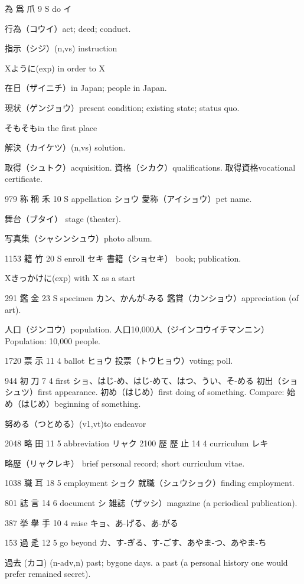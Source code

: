 為 爲 爪 9 S  do イ

行為（コウイ）act; deed; conduct.

指示（シジ）(n,vs) instruction

Xように(exp) in order to X

在日（ザイニチ）in Japan; people in Japan.

現状（ゲンジョウ）present condition; existing state; status quo.

そもそもin the first place

解決（カイケツ）(n,vs) solution.

取得（シュトク）acquisition.
資格（シカク）qualifications.
取得資格vocational certificate.

979	称	稱	禾	10	S		appellation	ショウ
愛称（アイショウ）pet name.

舞台（ブタイ）
stage (theater).

写真集（シャシンシュウ）photo album.

1153	籍		竹	20	S		enroll	セキ
書籍（ショセキ）
book; publication.

Xきっかけに(exp) with X as a start

291	鑑		金	23	S		specimen	カン、かんが-みる
鑑賞（カンショウ）appreciation (of art).

人口（ジンコウ）population.
人口10,000人（ジインコウイチマンニン）
Population: 10,000 people.

1720	票		示	11	4		ballot	ヒョウ
投票（トウヒョウ）voting; poll.

944	初		刀	7	4		first	ショ、はじ-め、はじ-めて、はつ、うい、そ-める
初出（ショシュツ）first appearance.
初め（はじめ）first doing of something.
Compare: 始め（はじめ）beginning of something.

努める（つとめる）(v1,vt)to endeavor

2048	略		田	11	5		abbreviation	リャク
2100	歴	歷	止	14	4		curriculum	レキ

略歴（リャクレキ）
brief personal record;
short curriculum vitae.

1038	職		耳	18	5		employment	ショク
就職（シュウショク）finding employment.

801	誌		言	14	6		document	シ
雑誌（ザッシ）magazine (a periodical publication).

387	挙	擧	手	10	4		raise	キョ、あ-げる、あ-がる

153	過		辵	12	5		go beyond	カ、す-ぎる、す-ごす、あやま-つ、あやま-ち

過去 (カコ) (n-adv,n)
past; bygone days.
a past (a personal history one would prefer remained secret).

